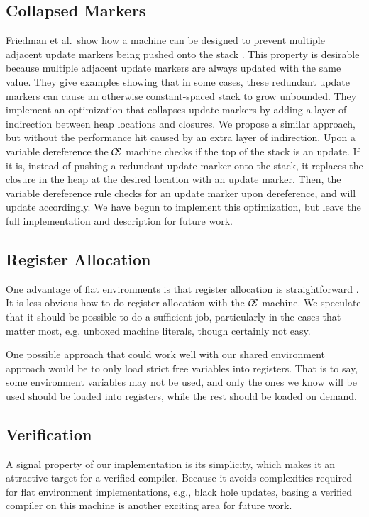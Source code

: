 \subsection{Collapsed Markers}
Friedman et al.\ show how a machine can be designed to prevent multiple adjacent
update markers being pushed onto the stack \cite{lkm}.  This property is
desirable because multiple adjacent update markers are always updated with the
same value. They give examples showing that in some cases, these redundant
update markers can cause an otherwise constant-spaced stack to grow unbounded.
They implement an optimization that collapses update markers by adding a layer
of indirection between heap locations and closures. We propose a similar
approach, but without the performance hit caused by an extra layer of
indirection. Upon a variable dereference the $\mathcal{\mathcal{C} \mskip -4mu \mathcal{E}}$ machine checks if the
top of the stack is an update. If it is, instead of pushing a redundant update
marker onto the stack, it replaces the closure in the heap at the desired
location with an update marker.  Then, the variable dereference rule checks for
an update marker upon dereference, and will update accordingly. We have begun
to implement this optimization, but leave the full implementation and
description for future work.

\subsection{Register Allocation} \label{sec:alloc}
One advantage of flat environments is that register allocation is
straightforward \cite{appel1992compiling,jonesstg,terei2010llvm}. It is less
obvious how to do register allocation with the $\mathcal{\mathcal{C} \mskip
-4mu \mathcal{E}}$ machine. We speculate that it should be possible to do a
sufficient job, particularly in the cases that matter most, e.g. unboxed
machine literals, though certainly not easy. 

One possible approach that could work well with our shared environment approach
would be to only load strict free variables into registers. That is to say,
some environment variables may not be used, and only the ones we know will be
used should be loaded into registers, while the rest should be loaded on demand. 

\subsection{Verification}
A signal property of our implementation is its simplicity, which makes it an
attractive target for a verified compiler. Because it avoids complexities
required for flat environment implementations, e.g., black hole updates, basing
a verified compiler on this machine is another exciting area for future work. 
